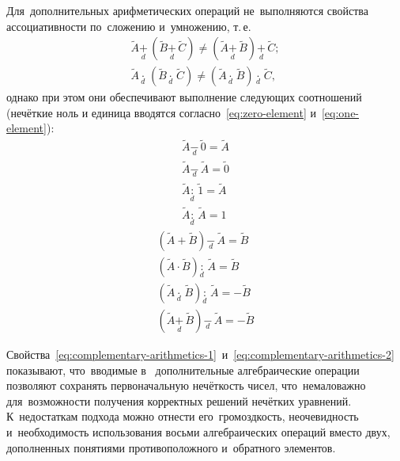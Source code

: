 Для~дополнительных арифметических операций не~выполняются свойства ассоциативности по~сложению и~умножению, т.\,е.
\begin{gather*}
		\tilde{A}\underset{d}{\mathop{+}}\,\left( \tilde{B}\underset{d}{\mathop{+}}\,\tilde{C} \right)\ne \left( \tilde{A}\underset{d}{\mathop{+}}\,\tilde{B} \right)\underset{d}{\mathop{+}}\,\tilde{C}; \\ 
		\tilde{A}\underset{d}{\mathop{\cdot }}\,\left( \tilde{B}\underset{d}{\mathop{\cdot }}\,\tilde{C} \right)\ne \left( \tilde{A}\underset{d}{\mathop{\cdot }}\,\tilde{B} \right)\underset{d}{\mathop{\cdot }}\,\tilde{C},
\end{gather*}
однако при этом они обеспечивают выполнение следующих соотношений (нечёткие ноль и единица вводятся согласно~\eqref{eq:zero-element} и~\eqref{eq:one-element}):
\begin{equation}
\label{eq:complementary-arithmetics-1}
\begin{matrix}
  \tilde{A}\underset{d}{\mathop{-}}\,\tilde{0}=\tilde{A} \\ 
  \tilde{A}\underset{d}{\mathop{-}}\,\tilde{A}=\tilde{0} \\ 
  \tilde{A}\underset{d}{\mathop{:}}\,\tilde{1}=\tilde{A} \\ 
  \tilde{A}\underset{d}{\mathop{:}}\,\tilde{A}=1 
\end{matrix}
\end{equation}
\begin{equation}
\label{eq:complementary-arithmetics-2}
\begin{matrix}
  \left( \tilde{A}+\tilde{B} \right)\underset{d}{\mathop{-}}\,\tilde{A}=\tilde{B} \\ 
  \left( \tilde{A}\cdot \tilde{B} \right)\underset{d}{\mathop{:}}\,\tilde{A}=\tilde{B} \\ 
  \left( \tilde{A}\underset{d}{\mathop{\cdot }}\,\tilde{B} \right)\underset{d}{\mathop{:}}\,\tilde{A}=-\tilde{B} \\ 
  \left( \tilde{A}\underset{d}{\mathop{+}}\,\tilde{B} \right)\underset{d}{\mathop{-}}\,\tilde{A}=-\tilde{B} 
\end{matrix}
\end{equation}

Свойства~\eqref{eq:complementary-arithmetics-1}~и~\eqref{eq:complementary-arithmetics-2} показывают, что~вводимые в~\cite{Piter_SCM} дополнительные алгебраические операции позволяют сохранять первоначальную нечёткость чисел, что~немаловажно для~возможности получения корректных решений нечётких уравнений. К~недостаткам подхода можно отнести его~громоздкость, неочевидность и~необходимость использования восьми алгебраических операций вместо двух, дополненных понятиями противоположного и~обратного элементов.

